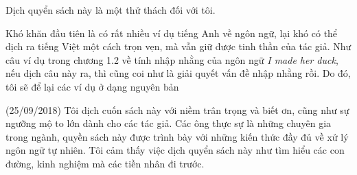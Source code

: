 Dịch quyển sách này là một thử thách đối với tôi.

Khó khăn đầu tiên là có rất nhiều ví dụ tiếng Anh về ngôn ngữ, lại khó có thể dịch ra tiếng Việt một cách trọn vẹn, mà vẫn giữ được tinh thần của tác giả. Như câu ví dụ trong chương 1.2 về tính nhập nhằng của ngôn ngữ \textit{I made her duck}, nếu dịch câu này ra, thì cũng coi như là giải quyết vấn đề nhập nhằng rồi. Do đó, tôi sẽ để lại các ví dụ ở dạng nguyên bản

(25/09/2018) Tôi dịch cuốn sách này với niềm trân trọng và biết ơn, cũng như sự ngưỡng mộ to lớn dành cho các tác giả. Các ông thực sự là những chuyên gia trong ngành, quyền sách này được trình bày với những kiến thức đầy đủ về xử lý ngôn ngữ tự nhiên. Tôi cảm thấy việc dịch quyển sách này như tìm hiểu các con đường, kinh nghiệm mà các tiền nhân đi trước.


